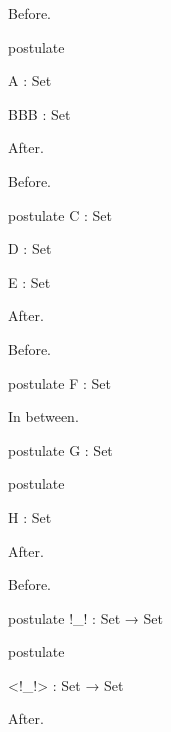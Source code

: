 \documentclass{article}
\begin{document}
\noindent Before.
\begin{AgdaMultiCode}{2}
\begin{code}[hide]
  postulate
\end{code}
\begin{code}
    A    : Set
\end{code}
\begin{code}
    BBB  : Set
\end{code}
\end{AgdaMultiCode}
After.

\noindent Before.
\begin{AgdaAlign}
\begin{code}
  postulate
    C : Set
\end{code}
\begin{code}[hide]
    D : Set
\end{code}
\begin{code}
    E : Set
\end{code}
\end{AgdaAlign}
After.

\noindent Before.
\begin{AgdaAlign}
\begin{code}
  postulate
    F : Set
\end{code}
In between.
\begin{AgdaSuppressSpace}{2}
\begin{code}
  postulate
    G : Set
\end{code}
\begin{code}[hide]
  postulate
\end{code}
\begin{code}
    H : Set
\end{code}
\end{AgdaSuppressSpace}
\end{AgdaAlign}
After.

\noindent Before.
\begin{AgdaMultiCode}{2}
\begin{code}
  postulate
    !_!    : Set → Set
\end{code}
\begin{code}[hide]
  postulate
\end{code}
\begin{code}
    <!_!>  : Set → Set
\end{code}
\end{AgdaMultiCode}
After.
\end{document}
